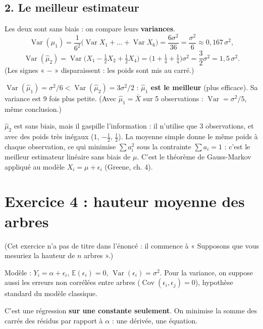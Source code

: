 \documentclass[11pt,a4paper]{article}
\newcommand{\E}{\mathbb{E}}\newcommand{\Var}{\operatorname{Var}}\newcommand{\Cov}{\operatorname{Cov}}
\begin{document}
\subsection*{2. Le meilleur estimateur}
Les deux sont sans biais : on compare leurs \textbf{variances}.
\[
\Var(\hat\mu_1)=\frac{1}{6^2}\big(\Var X_1+\dots+\Var X_6\big)=\frac{6\sigma^2}{36}=\frac{\sigma^2}{6}\approx0{,}167\,\sigma^2,
\]
\[
\Var(\hat\mu_2)=\Var\Big(X_1-\tfrac12X_2+\tfrac12X_4\Big)=\Big(1+\tfrac14+\tfrac14\Big)\sigma^2=\frac{3}{2}\sigma^2=1{,}5\,\sigma^2 .
\]
(Les signes « $-$ » disparaissent : les poids sont mis au carré.)

\begin{reponse}
$\Var(\hat\mu_1)=\sigma^2/6<\Var(\hat\mu_2)=3\sigma^2/2$ : \textbf{$\hat\mu_1$ est le meilleur} (plus efficace). Sa variance est 9 fois plus petite. (Avec $\hat\mu_1=\bar X$ sur 5 observations : $\Var=\sigma^2/5$, même conclusion.)
\end{reponse}

\begin{intuition}
$\hat\mu_2$ est sans biais, mais il gaspille l'information : il n'utilise que 3 observations, et avec des poids très inégaux ($1$, $-\frac12$, $\frac12$). La moyenne simple donne le même poids à chaque observation, ce qui minimise $\sum a_i^2$ sous la contrainte $\sum a_i=1$ : c'est le meilleur estimateur linéaire sans biais de $\mu$. C'est le théorème de Gauss-Markov appliqué au modèle $X_i=\mu+\epsilon_i$ (Greene, ch. 4).
\end{intuition}

\section{Exercice 4 : hauteur moyenne des arbres}

(Cet exercice n'a pas de titre dans l'énoncé : il commence à « Supposons que vous mesuriez la hauteur de $n$ arbres ».)

Modèle : $Y_i=\alpha+\epsilon_i$, $\E(\epsilon_i)=0$, $\Var(\epsilon_i)=\sigma^2$. Pour la variance, on suppose aussi les erreurs non corrélées entre arbres ($\Cov(\epsilon_i,\epsilon_j)=0$), hypothèse standard du modèle classique.

\begin{idee}
C'est une régression \textbf{sur une constante seulement}. On minimise la somme des carrés des résidus par rapport à $\alpha$ : une dérivée, une équation.
\end{idee}
\end{document}
